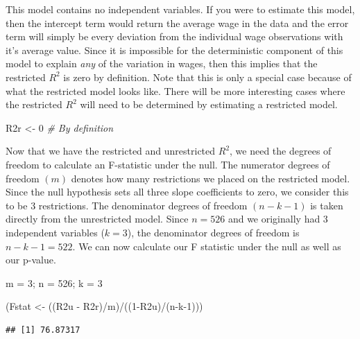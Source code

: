 \documentclass[
]{book}
\newenvironment{Shaded}{\begin{snugshade}}{\end{snugshade}}
\newcommand{\CommentTok}[1]{\textcolor[rgb]{0.56,0.35,0.01}{\textit{#1}}}
\newcommand{\DecValTok}[1]{\textcolor[rgb]{0.00,0.00,0.81}{#1}}
\newcommand{\NormalTok}[1]{#1}
\newcommand{\OtherTok}[1]{\textcolor[rgb]{0.56,0.35,0.01}{#1}}
\newcommand{\SpecialCharTok}[1]{\textcolor[rgb]{0.00,0.00,0.00}{#1}}
\begin{document}
This model contains no independent variables. If you were to estimate this model, then the intercept term would return the average wage in the data and the error term will simply be every deviation from the individual wage observations with it's average value. Since it is impossible for the deterministic component of this model to explain \emph{any} of the variation in wages, then this implies that the restricted \(R^2\) is zero by definition. Note that this is only a special case because of what the restricted model looks like. There will be more interesting cases where the restricted \(R^2\) will need to be determined by estimating a restricted model.

\begin{Shaded}
\begin{Highlighting}[]
\NormalTok{R2r }\OtherTok{\textless{}{-}} \DecValTok{0} \CommentTok{\# By definition}
\end{Highlighting}
\end{Shaded}

Now that we have the restricted and unrestricted \(R^2\), we need the degrees of freedom to calculate an F-statistic under the null. The numerator degrees of freedom \((m)\) denotes how many restrictions we placed on the restricted model. Since the null hypothesis sets all three slope coefficients to zero, we consider this to be 3 restrictions. The denominator degrees of freedom \((n-k-1)\) is taken directly from the unrestricted model. Since \(n=526\) and we originally had 3 independent variables (\(k=3\)), the denominator degrees of freedom is \(n-k-1=522\). We can now calculate our F statistic under the null as well as our p-value.

\begin{Shaded}
\begin{Highlighting}[]
\NormalTok{m }\OtherTok{=} \DecValTok{3}\NormalTok{; n }\OtherTok{=} \DecValTok{526}\NormalTok{; k }\OtherTok{=} \DecValTok{3}

\NormalTok{(Fstat }\OtherTok{\textless{}{-}}\NormalTok{ ((R2u }\SpecialCharTok{{-}}\NormalTok{ R2r)}\SpecialCharTok{/}\NormalTok{m)}\SpecialCharTok{/}\NormalTok{((}\DecValTok{1}\SpecialCharTok{{-}}\NormalTok{R2u)}\SpecialCharTok{/}\NormalTok{(n}\SpecialCharTok{{-}}\NormalTok{k}\DecValTok{{-}1}\NormalTok{)))}
\end{Highlighting}
\end{Shaded}

\begin{verbatim}
## [1] 76.87317
\end{verbatim}
\end{document}
